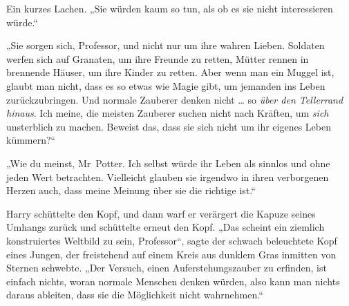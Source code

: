 Ein kurzes Lachen.
„Sie würden kaum so tun, als ob es sie nicht interessieren würde.“

„Sie sorgen sich, Professor, und nicht nur um ihre wahren Lieben. Soldaten werfen sich auf Granaten, um ihre Freunde zu retten, Mütter rennen in brennende Häuser, um ihre Kinder zu retten. Aber wenn man ein Muggel ist, glaubt man nicht, dass es so etwas wie Magie gibt, um jemanden ins Leben zurückzubringen. Und normale Zauberer denken nicht … so \emph{über den Tellerrand hinaus}. Ich meine, die meisten Zauberer suchen nicht nach Kräften, um \emph{sich} unsterblich zu machen. Beweist das, dass sie sich nicht um ihr eigenes Leben kümmern?“

„Wie du meinst, Mr~Potter. Ich selbst würde ihr Leben als sinnlos und ohne jeden Wert betrachten. Vielleicht glauben sie irgendwo in ihren verborgenen Herzen auch, dass meine Meinung über sie die richtige ist.“

Harry schüttelte den Kopf, und dann warf er verärgert die Kapuze seines Umhangs zurück und schüttelte erneut den Kopf.
„Das scheint ein ziemlich konstruiertes Weltbild zu sein, Professor“, sagte der schwach beleuchtete Kopf eines Jungen, der freistehend auf einem Kreis aus dunklem Gras inmitten von Sternen schwebte.
„Der Versuch, einen Auferstehungszauber zu erfinden, ist einfach nichts, woran normale Menschen denken würden, also kann man nichts daraus ableiten, dass sie die Möglichkeit nicht wahrnehmen.“

